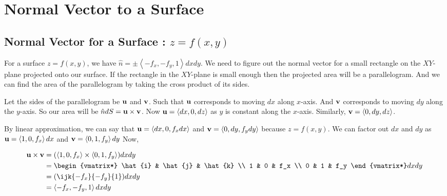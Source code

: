 

\chapter{Normal Vector to a Surface} 

\bigbreak

\section{Normal Vector for a Surface : $z = f(x, y)$}

For a surface $z = f(x, y)$, we have $\hat{n} = \pm \left< -f_x, -f_y, 1 \right> dx dy$.
We need to figure out the normal vector for a small rectangle on the $XY$-plane projected onto our surface.
If the rectangle in the $XY$-plane is small enough then the projected area will be a parallelogram.
And we can find the area of the parallelogram by taking the cross product of its sides.


Let the sides of the parallelogram be ${\bf u}$ and ${\bf v}$.
Such that ${\bf u}$ corresponds to moving $dx$ along $x$-axis.
And ${\bf v}$ corresponds to moving $dy$ along the $y$-axis. 
So our area will be $\hat{n} dS = {\bf u} \times {\bf v}$. 
Now ${\bf u} = \left< dx, 0, dz \right>$ as $y$ is constant along the $x$-axis.
Similarly, ${\bf v} = \left< 0, dy, dz \right>$. 

By linear approximation, we can say that ${\bf u} = \left< dx, 0, f_x dx \right>$
and ${\bf v} = \left< 0, dy, f_y dy \right>$ because $z = f(x, y)$.
We can factor out $dx$ and $dy$ as ${\bf u} = \left<1, 0, f_x \right> dx$ and ${\bf v} = \left< 0, 1, f_y \right> dy$
Now,

\begin{align*}
{\bf u} \times {\bf v} & = (\left< 1, 0, f_x \right> \times \left< 0, 1, f_y \right> ) dx dy \\
& =
\begin{vmatrix*}
    \hat{i} & \hat{j} & \hat{k} \\
    1 & 0 & f_x \\
    0 & 1 & f_y
\end{vmatrix*} dx dy \\
& = (\ijk{-f_x}{-f_y}{1}) dx dy \\
& = \left< -f_x, -f_y, 1 \right> dx dy
\end{align*}

